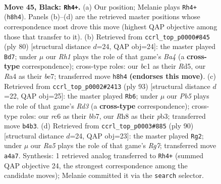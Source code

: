 \documentclass[11pt]{article}
\begin{document}
\clearpage

\begin{figure}[p]\centering
\begin{subfigure}{0.46\textwidth}\centering
\resizebox{\linewidth}{!}{%
\newchessgame
\chessboard[
  setfen={7r/4k3/1pR3p1/6p1/rp1PK3/8/8/2B5 b - - 0 45},
  showmover=false,
  pgfstyle=straightmove, color=movearrow, markmove={h8-h4}
]}
\caption{}
\end{subfigure}\hfill
\begin{subfigure}{0.46\textwidth}\centering
\resizebox{\linewidth}{!}{%
\newchessgame
\chessboard[
  setfen={8/4b1pk/4r3/3RP2p/B7/3p2P1/7P/5K2 w - - 0 41},
  showmover=false,
  pgfstyle=straightmove, color=movearrow, markmove={a4-d7}
]}
\caption{}
\end{subfigure}
\\[4pt]
\begin{subfigure}{0.46\textwidth}\centering
\resizebox{\linewidth}{!}{%
\newchessgame
\chessboard[
  setfen={8/1B4k1/p2r4/8/1P3p2/1P4p1/8/1K3R2 b - - 1 47},
  showmover=false,
  pgfstyle=straightmove, color=movearrow, markmove={d6-b6}
]}
\caption{}
\end{subfigure}\hfill
\begin{subfigure}{0.46\textwidth}\centering
\resizebox{\linewidth}{!}{%
\newchessgame
\chessboard[
  setfen={1k6/6R1/8/8/K1b1P2P/p6r/P7/8 w - - 0 46},
  showmover=false,
  pgfstyle=straightmove, color=movearrow, markmove={g7-g2}
]}
\caption{}
\end{subfigure}
\caption{\textbf{Move 45, Black: \texttt{Rh4+}.} (a) Our position; Melanie plays \texttt{Rh4+} (\texttt{h8h4}). Panels (b)--(d) are the retrieved master positions whose correspondence most drove this move (highest QAP objective among those that transfer to it). (b) Retrieved from \texttt{ccrl\_top\_p0000\#845} (ply 80) [structural distance $d$=24, QAP obj=24]: the master played \texttt{Bd7}; under $\mu$ our \emph{Rh1} plays the role of that game's \emph{Ba4} (a \textbf{cross-type} correspondence); cross-type roles: our \emph{b}c1 as their \emph{R}d5, our \emph{R}a4 as their \emph{b}e7; transferred move \texttt{h8h4} \textbf{(endorses this move)}. (c) Retrieved from \texttt{ccrl\_top\_p0002\#2413} (ply 93) [structural distance $d$=22, QAP obj=25]: the master played \texttt{Rb6}; under $\mu$ our \emph{Pb5} plays the role of that game's \emph{Rd3} (a \textbf{cross-type} correspondence); cross-type roles: our \emph{r}c6 as their \emph{b}b7, our \emph{R}h8 as their \emph{p}b3; transferred move \texttt{b4b3}. (d) Retrieved from \texttt{ccrl\_top\_p0003\#885} (ply 90) [structural distance $d$=24, QAP obj=23]: the master played \texttt{Rg2}; under $\mu$ our \emph{Ra5} plays the role of that game's \emph{Rg7}; transferred move \texttt{a4a7}. Synthesis: 1 retrieved analog transferred to \texttt{Rh4+} (summed QAP objective 24, the strongest correspondence among the candidate moves); Melanie committed it via the \texttt{search} selector.}
\label{fig:thought-m89}
\end{figure}
\end{document}
